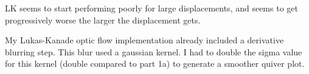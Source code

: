LK seems to start performing poorly for large displacements, and seems to get progressively worse the larger the displacement gets.

My Lukas-Kanade optic flow implementation already included a derivative blurring step. This blur used a gaussian kernel. I had to double the sigma value for this kernel (double compared to part 1a) to generate a smoother quiver plot.